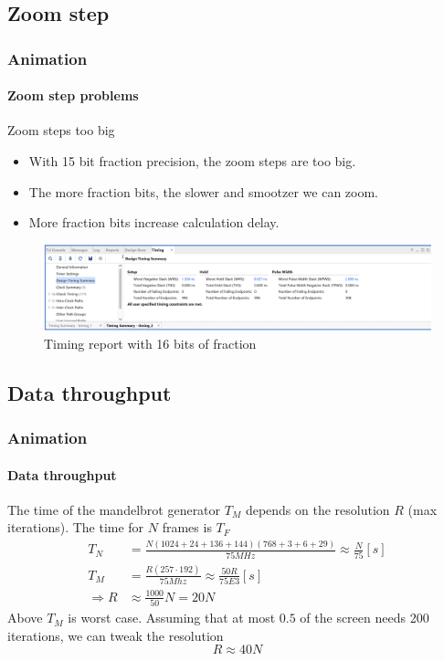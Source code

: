 \documentclass{beamer}
\begin{document}
\subsection{Zoom step}
\begin{frame}
    \frametitle{Animation}
    \framesubtitle{Zoom step problems}
    \begin{alertblock}{Zoom steps too big}
        \begin{itemize}
            \item With 15 bit fraction precision, the zoom steps are too big.
            \item The more fraction bits, the slower and smootzer we can zoom.
            \item More fraction bits increase calculation delay.
        \end{itemize}
        \begin{figure}
            \caption{Timing report with 16 bits of fraction}
            \includegraphics[width=\textwidth]{../imgs/timing_report.PNG}
        \end{figure}
    \end{alertblock}
\end{frame}

\subsection{Data throughput}
\begin{frame}
    \frametitle{Animation}
    \framesubtitle{Data throughput}
    The time of the mandelbrot generator $T_M$ depends on the resolution $R$ (max iterations). The time for $N$ frames is $T_F$
    \begin{equation}
        \begin{split}
            T_N&= \frac{N(1024 + 24 + 136 + 144)(768 + 3 + 6 + 29)}{75MHz}\approx\frac{N}{75}[s]\\
            T_M &=   \frac{R(257\cdot192)}{75Mhz}\approx\frac{50R}{75E3}[s]\\
            \Rightarrow R &\approx \frac{1000}{50}N = 20N
        \end{split}
    \end{equation}
    Above $T_M$ is worst case. Assuming that at most $0.5$ of the screen needs 200 iterations, we can tweak the resolution
    \begin{equation}
        R \approx 40N
    \end{equation}
\end{frame}
\end{document}
